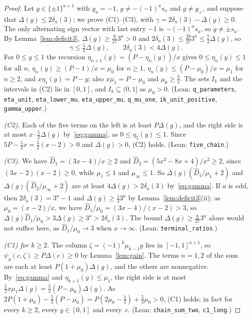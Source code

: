 \documentclass[11pt]{article}
\theoremstyle{remark}
\begin{document}
\begin{proof}
Let $g\in\{\pm1\}^{a+1}$ with $g_a=-1$, $g\ne-(-1)^as_a$ and $g\ne g_+$, and
suppose that $\Delta(g)\le2\delta_a(3)$; we prove (C1)--(C3), with
$\gamma=2\delta_a(3)-\Delta(g)\ge0$. The only alternating sign vector with last
entry $-1$ is $-(-1)^as_a$, so $g\ne\pm s_a$. By Lemma~\ref{lem:deficit3},
$\Delta(g)\ge\frac8{27}3^a>0$ and $2\delta_a(3)\le\frac{28}{27}3^a\le\frac72\Delta(g)$,
so
\begin{equation}\label{eq:gamma}
\gamma\le\tfrac52\Delta(g),\qquad 2\delta_a(3)<4\Delta(g).
\end{equation}
For $0\le y\le1$ the recursion $\eta_{n+1}(y)=(P-\eta_n(y))/x$ gives
$0\le\eta_n(y)\le1$ for all $n$, $\eta_n(y)\ge(P-1)/x=\mu_0$ for $n\ge1$,
$\eta_n(y)\le(P-\mu_0)/x=\mu_1$ for $n\ge2$, and $x\eta_1(y)=P-y$; also
$x\mu_1=P-\mu_0$ and $\mu_0\ge\frac35$. The sets $I_k$ and the intervals in (C2) lie
in $[0,1]$, and $I_k\subseteq(0,1]$ as $\mu_0>0$. (Lean: \texttt{q\_parameters},
\texttt{eta\_unit}, \texttt{eta\_lower\_mu}, \texttt{eta\_upper\_mu},
\texttt{q\_mu\_one}, \texttt{ik\_unit\_positive}, \texttt{gamma\_upper}.)

\emph{(C2).} Each of the five terms on the left is at least $P\Delta(g)$, and the
right side is at most $x\cdot\frac52\Delta(g)$ by~\eqref{eq:gamma}, as
$0\le\eta_5(y)\le1$. Since $5P-\frac52x=\frac52(x-2)>0$ and $\Delta(g)>0$, (C2)
holds. (Lean: \texttt{five\_chain}.)

\emph{(C3).} We have $\hat D_1=(3x-4)/x\ge2$ and
$\hat D_2=(5x^2-8x+4)/x^2\ge2$, since $(3x-2)(x-2)\ge0$, while $\mu_1\le1$ and
$\mu_\infty\le1$. So $\Delta(g)(\hat D_1/\mu_1+2)$ and
$\Delta(g)(\hat D_2/\mu_\infty+2)$ are at least $4\Delta(g)>2\delta_a(3)$
by~\eqref{eq:gamma}. If $a$ is odd, then $2\delta_a(3)=3^a-1$ and
$\Delta(g)\ge\frac13 3^a$ by Lemma~\ref{lem:deficit3}(ii); as $\mu_0=(x-2)/x$, we
have $\hat D_1/\mu_0=(3x-4)/(x-2)>3$, so $\Delta(g)\hat D_1/\mu_0>3\Delta(g)\ge
3^a>2\delta_a(3)$. The bound $\Delta(g)\ge\frac8{27}3^a$ alone would not suffice
here, as $\hat D_1/\mu_0\to3$ when $x\to\infty$. (Lean:
\texttt{terminal\_ratios}.)

\emph{(C1) for $k\ge2$.} The column $\zeta=(-1)^k\mu_{k-1}g$ lies in
$[-1,1]^{a+1}$, so $\psi_y(c,\zeta)\ge P\Delta(c)\ge0$ by Lemma~\ref{lem:gain}.
The terms $n=1,2$ of the sum are each at least $P(1+\mu_0)\Delta(g)$, and the
others are nonnegative. By~\eqref{eq:gamma} and $\eta_{k+1}(y)\le\mu_1$, the right
side is at most $\frac52x\mu_1\Delta(g)=\frac52(P-\mu_0)\Delta(g)$. As
$2P(1+\mu_0)-\frac52(P-\mu_0)=P(2\mu_0-\frac12)+\frac52\mu_0>0$, (C1) holds; in
fact for every $k\ge2$, every $y\in[0,1]$ and every~$c$. (Lean:
\texttt{chain\_sum\_two}, \texttt{c1\_long}.)


\end{proof}
\end{document}
